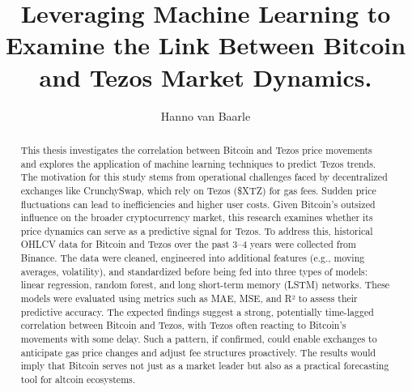 \documentclass{hogent-article}[english]
\title{Leveraging Machine Learning to Examine the Link Between Bitcoin and Tezos Market Dynamics.}
\author{Hanno van Baarle}
\begin{document}
\begin{abstract}
  This thesis investigates the correlation between Bitcoin and Tezos price movements and explores the application of machine learning techniques to predict Tezos trends. 
  The motivation for this study stems from operational challenges faced by decentralized exchanges like CrunchySwap, which rely on Tezos (\$XTZ) for gas fees. Sudden price fluctuations can lead to inefficiencies and higher user costs. 
  Given Bitcoin's outsized influence on the broader cryptocurrency market, this research examines whether its price dynamics can serve as a predictive signal for Tezos.
  To address this, historical OHLCV data for Bitcoin and Tezos over the past 3–4 years were collected from Binance. 
  The data were cleaned, engineered into additional features (e.g., moving averages, volatility), and standardized before being fed into three types of models: linear regression, random forest, and long short-term memory (LSTM) networks. These models were evaluated using metrics such as MAE, MSE, and R² to assess their predictive accuracy.
  The expected findings suggest a strong, potentially time-lagged correlation between Bitcoin and Tezos, with Tezos often reacting to Bitcoin’s movements with some delay. Such a pattern, if confirmed, could enable exchanges to anticipate gas price changes and adjust fee structures proactively. 
  The results would imply that Bitcoin serves not just as a market leader but also as a practical forecasting tool for altcoin ecosystems.
\end{abstract}

\tableofcontents



\printbibliography[heading=bibintoc]
\end{document}
